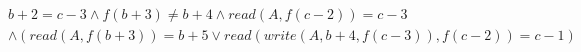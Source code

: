 \begin{align*}
%
& %
b + 2 = c - 3
%
\land
%
f(b + 3)  \neq  b + 4
%
\land
%
\mathit{read}(A,f(c - 2)) = c - 3
~\\~
& %
%
\land
%
(\mathit{read}(A,f(b + 3)) = b + 5 \lor \mathit{read}(\mathit{write}(A,b + 4,f(c - 3)),f(c - 2)) = c - 1)
%
\end{align*}
